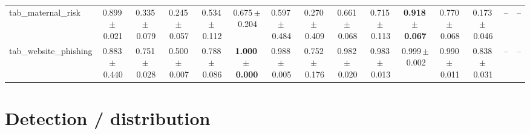 \documentclass[8pt]{extarticle}
\begin{document}
\begin{longtable}{l*{14}{c}}
tab\_maternal\_risk & 0.899\,$\pm$\,0.021 & 0.335\,$\pm$\,0.079 & 0.245\,$\pm$\,0.057 & 0.534\,$\pm$\,0.112 & 0.675\,$\pm$\,0.204 & 0.597\,$\pm$\,0.484 & 0.270\,$\pm$\,0.409 & 0.661\,$\pm$\,0.068 & 0.715\,$\pm$\,0.113 & \textbf{0.918\,$\pm$\,0.067} & 0.770\,$\pm$\,0.068 & 0.173\,$\pm$\,0.046 & -- & -- \\
tab\_website\_phishing & 0.883\,$\pm$\,0.440 & 0.751\,$\pm$\,0.028 & 0.500\,$\pm$\,0.007 & 0.788\,$\pm$\,0.086 & \textbf{1.000\,$\pm$\,0.000} & 0.988\,$\pm$\,0.005 & 0.752\,$\pm$\,0.176 & 0.982\,$\pm$\,0.020 & 0.983\,$\pm$\,0.013 & 0.999\,$\pm$\,0.002 & 0.990\,$\pm$\,0.011 & 0.838\,$\pm$\,0.031 & -- & -- \\
\end{longtable}

\section*{Detection / distribution}
\end{document}
